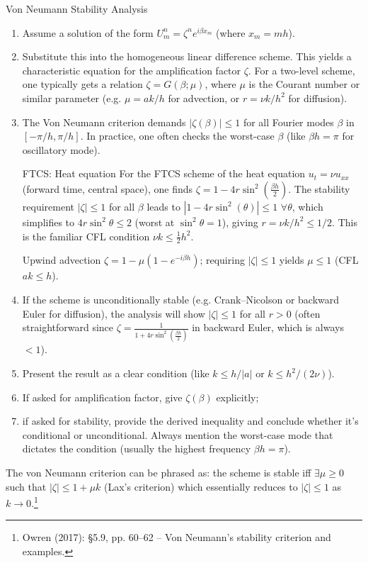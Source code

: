 \documentclass[a4paper,11pt]{report}
\begin{document}
\begin{outline}{Von Neumann Stability Analysis}{}
    \begin{enumerate}
        \item Assume a solution of the form $U^n_m = \zeta^n e^{i\beta x_m}$ (where $x_m = m h$).
        \item Substitute this into the homogeneous linear difference scheme. This yields a characteristic equation for the amplification factor $\zeta$. For a two-level scheme, one typically gets a relation $\zeta = G(\beta; \mu)$, where $\mu$ is the Courant number or similar parameter (e.g. $\mu=ak/h$ for advection, or $r=\nu k/h^2$ for diffusion).
        \item The Von Neumann criterion demands $|\zeta(\beta)| \le 1$ for all Fourier modes $\beta$ in $[-\pi/h,\pi/h]$.
              In practice, one often checks the worst-case $\beta$ (like $\beta h = \pi$ for oscillatory mode).
              \begin{example}{FTCS: Heat equation}{}
                  For the FTCS scheme of the heat equation $u_t=\nu u_{xx}$ (forward time, central space), one finds $\zeta = 1 - 4r\sin^2(\frac{\beta h}{2})$. The stability requirement $|\zeta| \le 1$ for all $\beta$ leads to $|1 - 4r\sin^2(\theta)| \le 1$ $\forall \theta$, which simplifies to $4r\sin^2\theta \le 2$ (worst at $\sin^2\theta=1$), giving $r=\nu k/h^2 \le 1/2$. This is the familiar CFL condition $\nu k \le \frac{1}{2}h^2$.
              \end{example}
              \begin{example}{Upwind advection}{}
                  $\zeta = 1 - \mu(1-e^{-i\beta h})$; requiring $|\zeta| \le 1$ yields $\mu \le 1$ (CFL $a k \le h$).
              \end{example}
        \item If the scheme is unconditionally stable (e.g. Crank--Nicolson or backward Euler for diffusion), the analysis will show $|\zeta| \le 1$ for all $r>0$ (often straightforward since $\zeta = \frac{1}{1+4r\sin^2(\frac{\beta h}{2})}$ in backward Euler, which is always $<1$).
        \item Present the result as a clear condition (like $k \le h/|a|$ or $k \le h^2/(2\nu)$).
        \item If asked for amplification factor, give $\zeta(\beta)$ explicitly;
        \item if asked for stability, provide the derived inequality and conclude whether it's conditional or unconditional. Always mention the worst-case mode that dictates the condition (usually the highest frequency $\beta h = \pi$).
    \end{enumerate}
    \medskip
    The von Neumann criterion can be phrased as: the scheme is stable iff $\exists \mu \ge 0$ such that $|\zeta| \le 1 + \mu k$ (Lax's criterion) which essentially reduces to $|\zeta| \le 1$ as $k \to 0$.\footnote{Owren (2017): §5.9, pp. 60--62 -- Von Neumann's stability criterion and examples.}
\end{outline}
\end{document}
